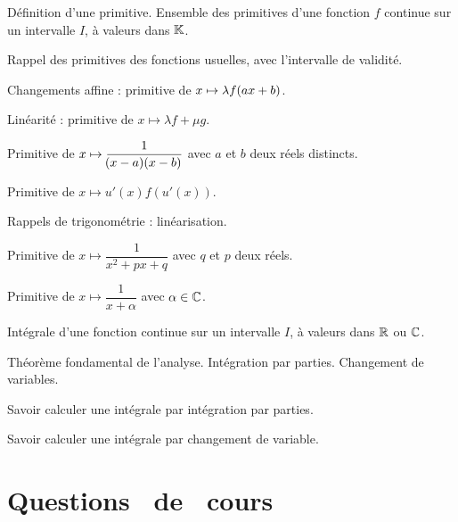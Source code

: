 \documentclass[a4paper,french,bookmarks]{book}
\renewcommand{\questionsdecours}{\section*{\centering\EBGaramond\Large Questions~ de~ cours}}
\begin{document}
    \begin{enumerate}
        \ithand Définition d'une primitive. Ensemble des primitives d'une fonction $f$ continue sur un intervalle $I$, à valeurs dans $\mathbb{K}$.
    
        \ithand Rappel des primitives des fonctions usuelles, avec l'intervalle de validité.
    
        \ithand Changements affine : primitive de $x \mapsto \lambda f\!\left(ax + b\right)$.
    
        \ithand Linéarité : primitive de $x \mapsto \lambda f + \mu g$.
    
        \ithand Primitive de $x \mapsto \dfrac{1}{\!\left(x-a\right)\!\left(x-b\right)}$ avec $a$ et $b$ deux réels distincts.
    
        \ithand Primitive de $x \mapsto u'\left(x\right)f\left(u'\left(x\right)\right)$.
    
        \ithand Rappels de trigonométrie : linéarisation.
    
        \ithand Primitive de $x \mapsto \dfrac{1}{x^2+px+q}$ avec $q$ et $p$ deux réels.
    
        \ithand Primitive de $x \mapsto \dfrac{1}{x + \alpha}$ avec $\alpha \in \mathbb{C}$.
        
        \ithand Intégrale d'une fonction continue sur un intervalle $I$, à valeurs dans $\mathbb{R}$ ou $\mathbb{C}$.

        \ithand Théorème fondamental de l'analyse. Intégration par parties. Changement de variables.
    \end{enumerate}

    \savoirfaire

    \begin{enumerate}
        \itt Savoir calculer une intégrale par intégration par parties.
    
        \itt Savoir calculer une intégrale par changement de variable.
    \end{enumerate}

    \questionsdecours
\end{document}
